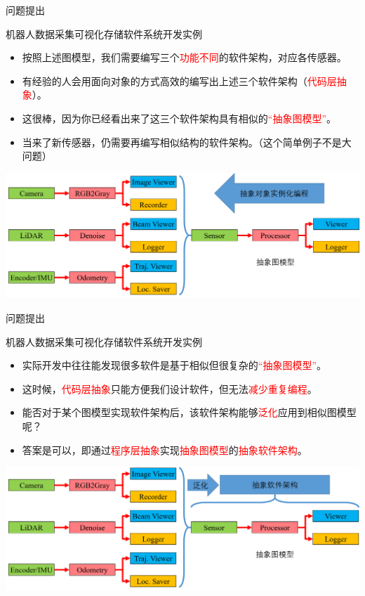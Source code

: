 \documentclass[9pt]{beamer}
\begin{document}
	\begin{frame}{问题提出}
		\begin{block}{机器人数据采集可视化存储软件系统开发实例}
			\begin{itemize}
				\item<1-> 按照上述图模型，我们需要编写三个\textcolor{red}{功能不同}的软件架构，对应各传感器。
				\item<2-> 有经验的人会用面向对象的方式高效的编写出上述三个软件架构（\textcolor{red}{代码层抽象}）。
				\item<2-> 这很棒，因为你已经看出来了这三个软件架构具有相似的\textcolor{red}{“抽象图模型”}。
				\item<3-> 当来了新传感器，仍需要再编写相似结构的软件架构。（这个简单例子不是大问题）
			\end{itemize}
		\end{block}
		\begin{center}
			\includegraphics[width=\textwidth]{./img/highlevel}
		\end{center}
	\end{frame}
	\begin{frame}{问题提出}
		\begin{block}{机器人数据采集可视化存储软件系统开发实例}
			\begin{itemize}
				\item<1-> 实际开发中往往能发现很多软件是基于相似但很复杂的\textcolor{red}{“抽象图模型”}。
				\item<2-> 这时候，\textcolor{red}{代码层抽象}只能方便我们设计软件，但无法\textcolor{red}{减少重复编程}。
				\item<3-> 能否对于某个图模型实现软件架构后，该软件架构能够\textcolor{red}{泛化}应用到相似图模型呢？
				\item<4-> 答案是可以，即通过\textcolor{red}{程序层抽象}实现\textcolor{red}{抽象图模型}的\textcolor{red}{抽象软件架构}。
			\end{itemize}
		\end{block}
		\begin{center}
			\includegraphics[width=\textwidth]{./img/highlevel1}
		\end{center}
	\end{frame}
	
\end{document}
